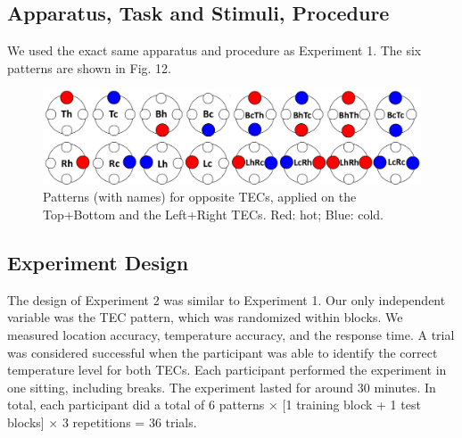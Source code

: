 \documentclass[preprint,12pt]{elsarticle}
\begin{document}
\subsection{Apparatus, Task and Stimuli, Procedure}
We used the exact same apparatus and procedure as Experiment 1. The six patterns are shown in Fig. 12.

\begin{figure}[tp]
  \centering
  \includegraphics[width=0.9\columnwidth]{img/fig12.pdf}
  \caption{Patterns (with names) for opposite TECs, applied on the Top+Bottom and the Left+Right TECs. Red: hot; Blue: cold.}
  \label{fig:12}
\end{figure}

\subsection{Experiment Design}
The design of Experiment 2 was similar to Experiment 1. Our only independent variable was the TEC pattern, which was randomized within blocks. We measured location accuracy, temperature accuracy, and the response time. A trial was considered successful when the participant was able to identify the correct temperature level for both TECs. Each participant performed the experiment in one sitting, including breaks. The experiment lasted for around 30 minutes. In total, each participant did a total of 6 patterns $\times$ [1 training block + 1 test blocks] $\times$ 3 repetitions = 36 trials.
\end{document}
